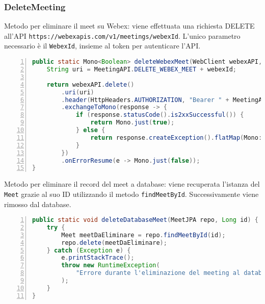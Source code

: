 \subsubsection{DeleteMeeting}
\noindent Metodo per eliminare il meet su Webex: viene effettuata una richiesta DELETE all'API \texttt{https://webexapis.com/v1/meetings/webexId}.
L'unico parametro necessario è il \texttt{WebexId}, insieme al token per autenticare l'API.
\begin{lstlisting}[language=java, frame=lines, basicstyle=\ttfamily\scriptsize, numbers=left]
 public static Mono<Boolean> deleteWebexMeet(WebClient webexAPI, String webexId) {
	String uri = MeetingAPI.DELETE_WEBEX_MEET + webexId;

	return webexAPI.delete()
	    .uri(uri)
	    .header(HttpHeaders.AUTHORIZATION, "Bearer " + MeetingAPI.TOKEN)
	    .exchangeToMono(response -> {
	        if (response.statusCode().is2xxSuccessful()) {
	            return Mono.just(true);
	        } else {
	            return response.createException().flatMap(Mono::error);
	        }
	    })
	    .onErrorResume(e -> Mono.just(false));
}
\end{lstlisting}
\noindent Metodo per eliminare il record del meet a database: viene recuperata l'istanza del \texttt{Meet} grazie al suo ID
utilizzando il metodo \texttt{findMeetById}. Successivamente viene rimosso dal database.
\begin{lstlisting}[language=java, frame=lines, basicstyle=\ttfamily\scriptsize, numbers=left]
public static void deleteDatabaseMeet(MeetJPA repo, Long id) {	
    try {     
        Meet meetDaEliminare = repo.findMeetById(id);      
        repo.delete(meetDaEliminare);      
    } catch (Exception e) {
        e.printStackTrace();
        throw new RuntimeException(
            "Errore durante l'eliminazione del meeting al database", e
        );
    }
}
\end{lstlisting}